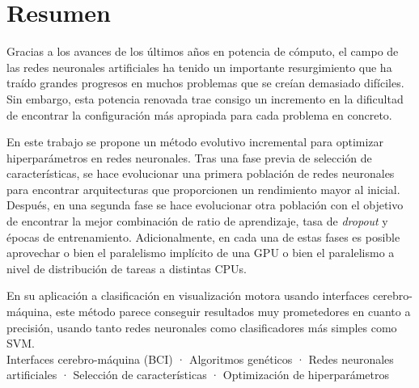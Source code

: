 \begingroup

\chapter*{Resumen}

Gracias a los avances de los últimos años en potencia de cómputo, el campo de las redes neuronales artificiales ha tenido un importante resurgimiento que ha traído grandes progresos en muchos problemas que se creían demasiado difíciles. Sin embargo, esta potencia renovada trae consigo un incremento en la dificultad de encontrar la configuración más apropiada para cada problema en concreto.

En este trabajo se propone un método evolutivo incremental para optimizar hiperparámetros en redes neuronales. Tras una fase previa de selección de características, se hace evolucionar una primera población de redes neuronales para encontrar arquitecturas que proporcionen un rendimiento mayor al inicial. Después, en una segunda fase se hace evolucionar otra población con el objetivo de encontrar la mejor combinación de ratio de aprendizaje, tasa de \textit{dropout} y épocas de entrenamiento. Adicionalmente, en cada una de estas fases es posible aprovechar o bien el paralelismo implícito de una GPU o bien el paralelismo a nivel de distribución de tareas a distintas CPUs.

En su aplicación a clasificación en visualización motora usando interfaces cerebro-máquina, este método parece conseguir resultados muy prometedores en cuanto a precisión, usando tanto redes neuronales como clasificadores más simples como SVM.\\

\noindent{} Interfaces cerebro-máquina (BCI) · Algoritmos genéticos · Redes neuronales artificiales · Selección de características · Optimización de hiperparámetros